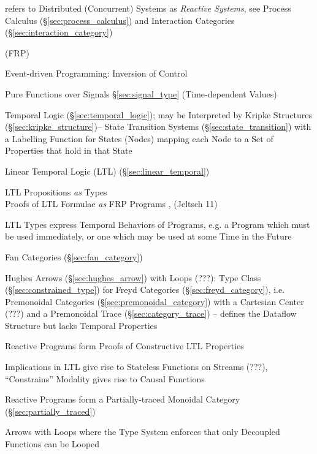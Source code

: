 
\fist \cite{winskel-nielsen93} refers to Distributed (Concurrent)
Systems as \emph{Reactive Systems}, see Process Calculus
(\S\ref{sec:process_calculus}) and Interaction Categories
(\S\ref{sec:interaction_category})

(FRP)

Event-driven Programming: Inversion of Control %

Pure Functions over Signals \S\ref{sec:signal_type} (Time-dependent Values)

Temporal Logic (\S\ref{sec:temporal_logic}); may be Interpreted by
Kripke Structures (\S\ref{sec:kripke_structure})-- State Transition
Systems (\S\ref{sec:state_transition}) with a Labelling Function for
States (Nodes) mapping each Node to a Set of Properties that hold in
that State

Linear Temporal Logic (LTL) (\S\ref{sec:linear_temporal})

LTL Propositions \emph{as} Types \\
Proofs of LTL Formulae \emph{as} FRP Programs \cite{jeffrey12},
(Jeltsch 11)

LTL Types express Temporal Behaviors of Programs, e.g. a Program which
must be used immediately, or one which may be used at some Time in the
Future \cite{jeffrey12} %

Fan Categories (\S\ref{sec:fan_category}) \cite{jeltsch12}

Hughes Arrows (\S\ref{sec:hughes_arrow}) with Loops (???): Type Class
(\S\ref{sec:constrained_type}) for Freyd Categories
(\S\ref{sec:freyd_category}), i.e. Premonoidal Categories
(\S\ref{sec:premonoidal_category}) with a Cartesian Center (???) and a
Premonoidal Trace (\S\ref{sec:category_trace}) -- defines the Dataflow
Structure but lacks Temporal Properties \cite{jeffrey12}

Reactive Programs form Proofs of Constructive LTL Properties
\cite{jeffrey12}

Implications in LTL give rise to Stateless Functions on Streams (???),
``Constrains'' Modality gives rise to Causal Functions
\cite{jeffrey12} %

Reactive Programs form a Partially-traced Monoidal Category
(\S\ref{sec:partially_traced}) \cite{jeffrey12}

Arrows with Loops where the Type System enforces that only Decoupled
Functions can be Looped \cite{jeffrey12}

